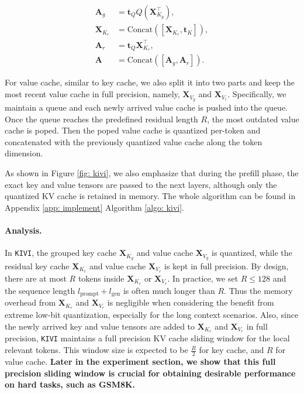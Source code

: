 \begin{align}
{\bm{A}}_g &= {\bm{t}}_Q Q({\bm{X}}^{\top}_{K_g}), \nonumber \\
{\bm{X}}_{K_r} &= \text{Concat}([{\bm{X}}_{K_r}, {\bm{t}}_K]), \nonumber \\
{\bm{A}}_r &= {\bm{t}}_Q {\bm{X}}^{\top}_{K_r}, \nonumber \\
{\bm{A}} &= \text{Concat}([{\bm{A}}_g, {\bm{A}}_r]).
\label{eq: attquant}
\end{align}

For value cache, similar to key cache, we also split it into two parts and keep the most recent value cache in full precision, namely, ${\bm{X}}_{V_g}$ and ${\bm{X}}_{V_r}$. Specifically, we maintain a queue and each newly arrived value cache is pushed into the queue. Once the queue reaches the predefined residual length $R$, the most outdated value cache is poped. Then the poped value cache is quantized per-token and concatenated with the previously quantized value cache along the token dimension. 

As shown in Figure \ref{fig: kivi}, we also emphasize that during the prefill phase, the exact key and value tensors are passed to the next layers, although only the quantized KV cache is retained in memory. The whole algorithm can be found in Appendix \ref{app: implement} Algorithm \ref{algo: kivi}.

\paragraph{Analysis.}
In \texttt{KIVI}, the grouped key cache ${\bm{X}}_{K_g}$ and value cache ${\bm{X}}_{V_g}$ is quantized, while the residual key cache ${\bm{X}}_{K_r}$ and value cache ${\bm{X}}_{V_r}$ is kept in full precision. By design, there are at most $R$ tokens inside ${\bm{X}}_{K_r}$ or ${\bm{X}}_{V_r}$. In practice, we set $R \leq 128$ and the sequence length $l_{\text{prompt}}+l_{\text{gen}}$ is often much longer than $R$. Thus the memory overhead from ${\bm{X}}_{K_r}$ and ${\bm{X}}_{V_r}$ is negligible when considering the benefit from extreme low-bit quantization, especially for the long context scenarios. Also, since the newly arrived key and value tensors are added to ${\bm{X}}_{K_r}$ and ${\bm{X}}_{V_r}$ in full precision, \texttt{KIVI} maintains a full precision KV cache sliding window for the local relevant tokens. This window size is expected to be $\frac{R}{2}$ for key cache, and $R$ for value cache.
\textbf{Later in the experiment section, we show that this full precision sliding window is crucial for obtaining desirable performance on hard tasks, such as GSM8K.}

